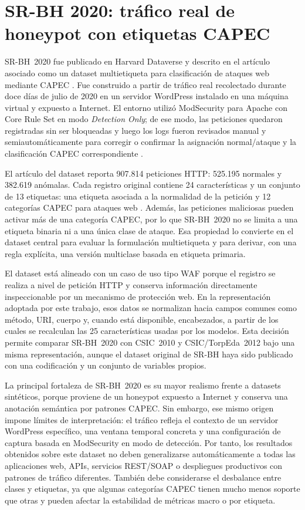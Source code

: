 \documentclass[12pt,oneside]{report}
\begin{document}
\section{SR-BH 2020: tráfico real de honeypot con etiquetas CAPEC}
SR-BH~2020 fue publicado en Harvard Dataverse y descrito en el artículo asociado como un dataset multietiqueta para clasificación de ataques web mediante CAPEC \cite{srbh_dataverse,srbh_paper}. Fue construido a partir de tráfico real recolectado durante doce días de julio de 2020 en un servidor WordPress instalado en una máquina virtual y expuesto a Internet. El entorno utilizó ModSecurity para Apache con Core Rule Set en modo \textit{Detection Only}; de ese modo, las peticiones quedaron registradas sin ser bloqueadas y luego los logs fueron revisados manual y semiautomáticamente para corregir o confirmar la asignación normal/ataque y la clasificación CAPEC correspondiente \cite{srbh_paper}.

El artículo del dataset reporta 907.814 peticiones HTTP: 525.195 normales y 382.619 anómalas. Cada registro original contiene 24 características y un conjunto de 13 etiquetas: una etiqueta asociada a la normalidad de la petición y 12 categorías CAPEC para ataques web \cite{srbh_paper}. Además, las peticiones maliciosas pueden activar más de una categoría CAPEC, por lo que SR-BH~2020 no se limita a una etiqueta binaria ni a una única clase de ataque. Esa propiedad lo convierte en el dataset central para evaluar la formulación multietiqueta y para derivar, con una regla explícita, una versión multiclase basada en etiqueta primaria.

El dataset está alineado con un caso de uso tipo WAF porque el registro se realiza a nivel de petición HTTP y conserva información directamente inspeccionable por un mecanismo de protección web. En la representación adoptada por este trabajo, esos datos se normalizan hacia campos comunes como método, URI, cuerpo y, cuando está disponible, encabezados, a partir de los cuales se recalculan las 25 características usadas por los modelos. Esta decisión permite comparar SR-BH~2020 con CSIC~2010 y CSIC/TorpEda~2012 bajo una misma representación, aunque el dataset original de SR-BH haya sido publicado con una codificación y un conjunto de variables propios.

La principal fortaleza de SR-BH~2020 es su mayor realismo frente a datasets sintéticos, porque proviene de un honeypot expuesto a Internet y conserva una anotación semántica por patrones CAPEC. Sin embargo, ese mismo origen impone límites de interpretación: el tráfico refleja el contexto de un servidor WordPress específico, una ventana temporal concreta y una configuración de captura basada en ModSecurity en modo de detección. Por tanto, los resultados obtenidos sobre este dataset no deben generalizarse automáticamente a todas las aplicaciones web, APIs, servicios REST/SOAP o despliegues productivos con patrones de tráfico diferentes. También debe considerarse el desbalance entre clases y etiquetas, ya que algunas categorías CAPEC tienen mucho menos soporte que otras y pueden afectar la estabilidad de métricas macro o por etiqueta.
\end{document}
